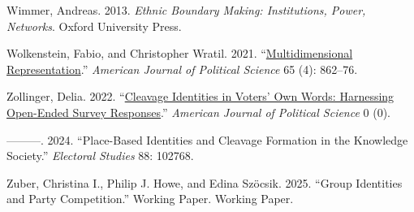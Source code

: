 \documentclass[12pt]{article}
\begin{document}
\begin{CSLReferences}{1}{0}
Wimmer, Andreas. 2013. \emph{Ethnic Boundary Making: Institutions, Power, Networks}. Oxford University Press.

Wolkenstein, Fabio, and Christopher Wratil. 2021. {``\href{https://doi.org/10.1111/ajps.12563}{Multidimensional Representation}.''} \emph{American Journal of Political Science} 65 (4): 862--76.

Zollinger, Delia. 2022. {``\href{https://doi.org/10.1111/ajps.12743}{Cleavage Identities in Voters' Own Words: Harnessing Open-Ended Survey Responses}.''} \emph{American Journal of Political Science} 0 (0).

---------. 2024. {``Place-Based Identities and Cleavage Formation in the Knowledge Society.''} \emph{Electoral Studies} 88: 102768.

Zuber, Christina I., Philip J. Howe, and Edina Szöcsik. 2025. {``Group Identities and Party Competition.''} Working Paper. Working Paper.

\end{CSLReferences}

\endgroup
\end{document}
